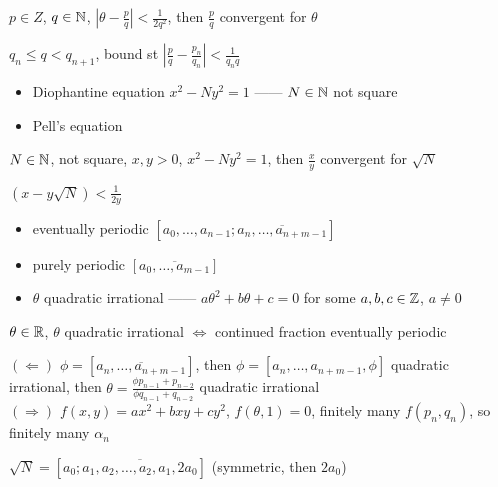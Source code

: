 \begin{cor}
    $p \in Z$, $q \in \mathbb{N}$, $|\theta - \frac{p}{q}| < \frac{1}{2q^2}$, then $\frac{p}{q}$ convergent for $\theta$
\end{cor}
\begin{pf}
    $q_{n} \leq q < q_{n+1}$, bound st $|\frac{p}{q} - \frac{p_n}{q_n}| < \frac{1}{q_n q}$
\end{pf}

\begin{itemize}
    \item Diophantine equation $x^2 - N y^2 = 1$ ------ $N \in \mathbb{N}$ not square
    \item Pell's equation
\end{itemize}

\begin{cor}
    $N \in \mathbb{N}$, not square, $x, y > 0$, $x^2 - N y^2 = 1$, then $\frac{x}{y}$ convergent for $\sqrt{N}$
\end{cor}
\begin{pf}
    $(x - y\sqrt{N}) < \frac{1}{2y}$
\end{pf}

\begin{itemize}
    \item eventually periodic $[a_0, \dots, a_{n-1}; \overline{a_n, \dots, a_{n + m -1}}]$
    \item purely periodic $[\overline{a_0, \dots, a_{m -1}}]$
    \item $\theta$ quadratic irrational ------ $a\theta^2 + b\theta + c = 0$ for some $a, b, c \in \mathbb{Z}$, $a \neq 0$
\end{itemize}

\begin{thm}[Lagrange]
    $\theta \in \mathbb{R}$, $\theta$ quadratic irrational $\iff$ continued fraction eventually periodic
\end{thm}
\begin{pf}
    $(\Leftarrow)$ $\phi = [\overline{a_n, \dots, a_{n + m -1}}]$, then $\phi = [a_n, \dots, a_{n+m-1}, \phi]$ quadratic irrational,
    then $\theta = \frac{\phi p_{n-1} + p_{n-2}}{\phi q_{n-1} + q_{n-2}}$ quadratic irrational\\
    $(\Rightarrow)$ $f(x, y) = ax^2 + bxy + cy^2$, $f(\theta, 1) = 0$, finitely many $f(p_n, q_n)$, so finitely many $\alpha_n$
\end{pf}

\begin{thm}
    $\sqrt{N} = [a_0;\overline{a_1, a_2, \dots, a_2, a_1, 2a_0}]$ (symmetric, then $2a_0$)
\end{thm}

